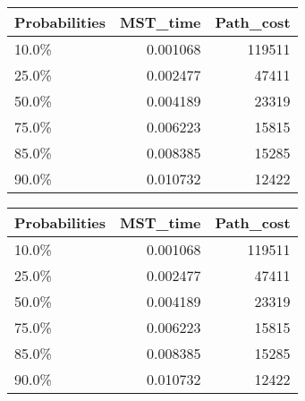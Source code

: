 \begin{tabular}{lrr}
\toprule
Probabilities &  MST\_time &  Path\_cost \\
\midrule
        10.0\% &  0.001068 &     119511 \\
        25.0\% &  0.002477 &      47411 \\
        50.0\% &  0.004189 &      23319 \\
        75.0\% &  0.006223 &      15815 \\
        85.0\% &  0.008385 &      15285 \\
        90.0\% &  0.010732 &      12422 \\
\bottomrule
\end{tabular}
\begin{tabular}{|l|r|r|}
\toprule \hline
Probabilities &  MST\_time &  Path\_cost \\ \hline

\midrule
        10.0\% &  0.001068 &     119511 \\ \hline

        25.0\% &  0.002477 &      47411 \\ \hline

        50.0\% &  0.004189 &      23319 \\ \hline

        75.0\% &  0.006223 &      15815 \\ \hline

        85.0\% &  0.008385 &      15285 \\ \hline

        90.0\% &  0.010732 &      12422 \\ \hline

\bottomrule
\end{tabular}

